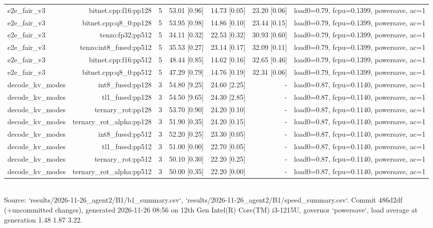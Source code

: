 \begin{table}[t]
\begin{tabular}{lrrrrrr}
e2e\_fair\_v3 & bitnet.cpp:f16:pp128 & 5 & 53.01 [0.96] & 14.73 [0.05] & 23.20 [0.06] & load0=0.79, fcpu=0.1399, powersave, ac=1 \\
e2e\_fair\_v3 & bitnet.cpp:q8\_0:pp128 & 5 & 53.95 [0.98] & 14.86 [0.10] & 23.44 [0.15] & load0=0.79, fcpu=0.1399, powersave, ac=1 \\
e2e\_fair\_v3 & tenzo:fp32:pp512 & 5 & 34.11 [0.32] & 22.53 [0.32] & 30.93 [0.60] & load0=0.79, fcpu=0.1399, powersave, ac=1 \\
e2e\_fair\_v3 & tenzo:int8\_fused:pp512 & 5 & 35.53 [0.27] & 23.14 [0.17] & 32.09 [0.11] & load0=0.79, fcpu=0.1399, powersave, ac=1 \\
e2e\_fair\_v3 & bitnet.cpp:f16:pp512 & 5 & 48.44 [0.85] & 14.62 [0.16] & 32.65 [0.46] & load0=0.79, fcpu=0.1399, powersave, ac=1 \\
e2e\_fair\_v3 & bitnet.cpp:q8\_0:pp512 & 5 & 47.29 [0.79] & 14.76 [0.19] & 32.31 [0.06] & load0=0.79, fcpu=0.1399, powersave, ac=1 \\
decode\_kv\_modes & int8\_fused:pp128 & 3 & 54.80 [9.25] & 24.60 [2.25] & - & load0=0.87, fcpu=0.1140, powersave, ac=1 \\
decode\_kv\_modes & tl1\_fused:pp128 & 3 & 54.50 [9.65] & 24.30 [2.85] & - & load0=0.87, fcpu=0.1140, powersave, ac=1 \\
decode\_kv\_modes & ternary\_rot:pp128 & 3 & 53.70 [0.90] & 24.20 [0.10] & - & load0=0.87, fcpu=0.1140, powersave, ac=1 \\
decode\_kv\_modes & ternary\_rot\_alpha:pp128 & 3 & 51.90 [0.35] & 24.20 [0.15] & - & load0=0.87, fcpu=0.1140, powersave, ac=1 \\
decode\_kv\_modes & int8\_fused:pp512 & 3 & 52.20 [0.25] & 23.30 [0.05] & - & load0=0.87, fcpu=0.1140, powersave, ac=1 \\
decode\_kv\_modes & tl1\_fused:pp512 & 3 & 51.00 [0.00] & 22.70 [0.05] & - & load0=0.87, fcpu=0.1140, powersave, ac=1 \\
decode\_kv\_modes & ternary\_rot:pp512 & 3 & 50.10 [0.30] & 22.20 [0.25] & - & load0=0.87, fcpu=0.1140, powersave, ac=1 \\
decode\_kv\_modes & ternary\_rot\_alpha:pp512 & 3 & 50.00 [0.35] & 22.20 [0.00] & - & load0=0.87, fcpu=0.1140, powersave, ac=1 \\
\bottomrule\end{tabular}
\\[2pt]{\scriptsize Source: `results/2026-11-26\_agent2/B1/b1\_summary.csv`, `results/2026-11-26\_agent2/B1/speed\_summary.csv`. Commit 486d2df (+uncommitted changes), generated 2026-11-26 08:56 on 12th Gen Intel(R) Core(TM) i3-1215U, governor `powersave`, load average at generation 1.48 1.87 3.22.}
\end{table}
